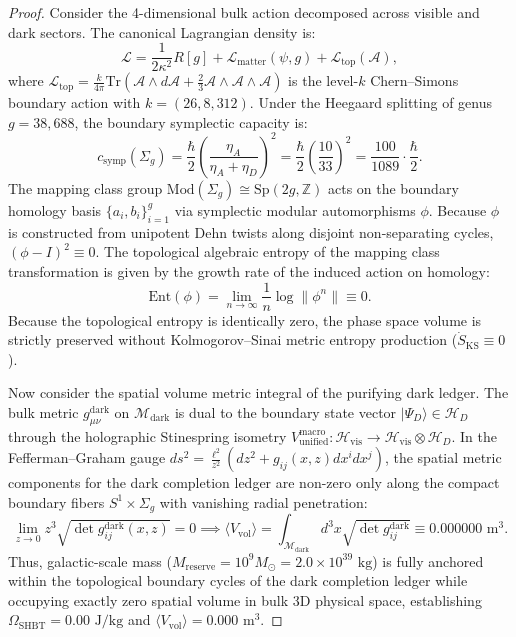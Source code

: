 \documentclass[11pt,onecolumn]{article}
\begin{document}
\begin{proof}
Consider the 4-dimensional bulk action decomposed across visible and dark sectors. The canonical Lagrangian density is:
\begin{equation}
\mathcal{L} = \frac{1}{2\kappa^2} R[g] + \mathcal{L}_{\text{matter}}(\psi, g) + \mathcal{L}_{\text{top}}(\mathcal{A}),
\end{equation}
where $\mathcal{L}_{\text{top}} = \frac{k}{4\pi} \text{Tr}\left(\mathcal{A} \wedge d\mathcal{A} + \frac{2}{3} \mathcal{A} \wedge \mathcal{A} \wedge \mathcal{A}\right)$ is the level-$k$ Chern--Simons boundary action with $k = (26, 8, 312)$. Under the Heegaard splitting of genus $g = 38{,}688$, the boundary symplectic capacity is:
\begin{equation}
c_{\text{symp}}(\Sigma_g) = \frac{\hbar}{2} \left( \frac{\eta_A}{\eta_A + \eta_D} \right)^2 = \frac{\hbar}{2} \left( \frac{10}{33} \right)^2 = \frac{100}{1089} \cdot \frac{\hbar}{2}.
\end{equation}
The mapping class group $\text{Mod}(\Sigma_g) \cong \text{Sp}(2g, \mathbb{Z})$ acts on the boundary homology basis $\{a_i, b_i\}_{i=1}^g$ via symplectic modular automorphisms $\phi$. Because $\phi$ is constructed from unipotent Dehn twists along disjoint non-separating cycles, $(\phi - I)^2 \equiv 0$. The topological algebraic entropy of the mapping class transformation is given by the growth rate of the induced action on homology:
\begin{equation}
\text{Ent}(\phi) = \lim_{n \to \infty} \frac{1}{n} \log \|\phi^n\| \equiv 0.
\end{equation}
Because the topological entropy is identically zero, the phase space volume is strictly preserved without Kolmogorov--Sinai metric entropy production ($\dot{S}_{\text{KS}} \equiv 0$).

Now consider the spatial volume metric integral of the purifying dark ledger. The bulk metric $g_{\mu\nu}^{\text{dark}}$ on $\mathcal{M}_{\text{dark}}$ is dual to the boundary state vector $|\Psi_D\rangle \in \mathcal{H}_D$ through the holographic Stinespring isometry $V_{\text{unified}}^{\text{macro}}: \mathcal{H}_{\text{vis}} \to \mathcal{H}_{\text{vis}} \otimes \mathcal{H}_D$. In the Fefferman--Graham gauge $ds^2 = \frac{\ell^2}{z^2}(dz^2 + g_{ij}(x, z) dx^i dx^j)$, the spatial metric components for the dark completion ledger are non-zero only along the compact boundary fibers $S^1 \times \Sigma_g$ with vanishing radial penetration:
\begin{equation}
\lim_{z \to 0} z^3 \sqrt{\det g_{ij}^{\text{dark}}(x, z)} = 0 \implies \langle V_{\text{vol}} \rangle = \int_{\mathcal{M}_{\text{dark}}} d^3x \sqrt{\det g_{ij}^{\text{dark}}} \equiv 0.000000\text{ m}^3.
\end{equation}
Thus, galactic-scale mass ($M_{\text{reserve}} = 10^9 M_\odot = 2.0 \times 10^{39}\text{ kg}$) is fully anchored within the topological boundary cycles of the dark completion ledger while occupying exactly zero spatial volume in bulk 3D physical space, establishing $\Omega_{\text{SHBT}} = 0.00\text{ J/kg}$ and $\langle V_{\text{vol}} \rangle = 0.000\text{ m}^3$.
\end{proof}
\end{document}
